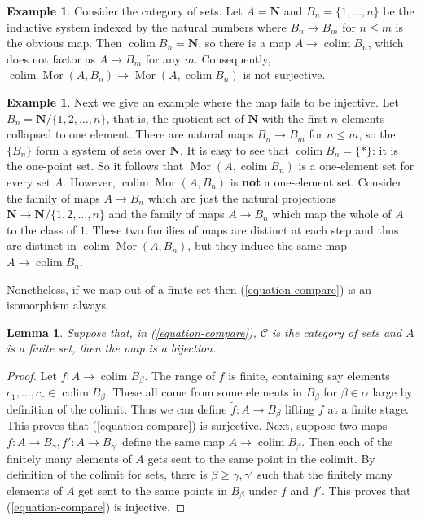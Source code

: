 \documentclass{stacks-project}
\theoremstyle{plain}
\newtheorem{lemma}[subsection]{Lemma}
\theoremstyle{definition}
\newtheorem{example}[subsection]{Example}
\theoremstyle{remark}
\numberwithin{equation}{subsection}
\def\colim{\mathop{\mathrm{colim}}\nolimits}
\def\Mor{\mathop{\mathrm{Mor}}\nolimits}
\begin{document}
\begin{example}
\label{example-not-surjective}
Consider the category of sets. Let $A = \mathbf{N}$ and
$B_n = \{1, \ldots, n\}$ be the inductive system indexed by the natural numbers
where $B_n \to B_m$ for $n \leq m$ is the obvious map. Then
$\colim B_n = \mathbf{N}$, so there is a map
$A \to \colim B_n$, which does not factor as $A \to B_m$
for any $m$. Consequently,
$\colim \Mor(A, B_n) \to \Mor(A, \colim B_n)$
is not surjective.
\end{example}

\begin{example}
\label{example-not-injective}
Next we give an example where the map fails to be injective. Let $B_n =
\mathbf{N}/\{1,  2, \ldots, n\}$, that is, the quotient set of
$\mathbf{N}$ with the first $n$ elements collapsed to one element.
There are natural maps $B_n \to B_m$ for $n \leq m$, so the
$\{B_n\}$ form a system of sets over $\mathbf{N}$. It is easy to see that
$\colim B_n = \{*\}$: it is the one-point set.
So it follows that $\Mor(A, \colim B_n)$ is a one-element set
for every set $A$.
However, $\colim \Mor(A , B_n)$ is {\bf not} a one-element set.
Consider the family of maps $A \to B_n$ which are just the natural projections
$\mathbf{N} \to \mathbf{N}/\{1, 2, \ldots, n\}$ and the family of
maps $A \to B_n$ which map the whole of $A$ to the class of $1$.
These two families of maps are distinct at each step and thus are distinct in
$\colim \Mor(A, B_n)$, but they induce the same map
$A \to \colim B_n$.
\end{example}

\noindent
Nonetheless, if we map out of a finite set then
(\ref{equation-compare}) is an isomorphism always.

\begin{lemma}
\label{lemma-out-of-finite}
Suppose that, in (\ref{equation-compare}), $\mathcal{C}$ is the category
of sets and $A$ is a {\it finite set}, then the map is a bijection.
\end{lemma}

\begin{proof}
Let $f : A \to \colim B_\beta$.
The range of $f$ is finite, containing say
elements $c_1, \ldots, c_r \in \colim B_\beta$.
These all come from some elements in $B_\beta$ for $\beta \in \alpha$
large by definition of the colimit. Thus we can define
$\widetilde{f} : A \to B_\beta$ lifting $f$ at a finite stage.
This proves that (\ref{equation-compare}) is surjective.
Next, suppose two maps $f : A \to B_\gamma, f' : A \to B_{\gamma'}$
define the same map $A \to \colim B_\beta$.
Then each of the finitely many elements of $A$ gets sent to the same point in
the colimit. By definition of the colimit for sets, there is
$\beta \geq \gamma, \gamma'$ such that the finitely many elements of
$A$ get sent to the same points in $B_\beta$ under $f$ and $f'$.
This proves that (\ref{equation-compare}) is injective.
\end{proof}
\end{document}
